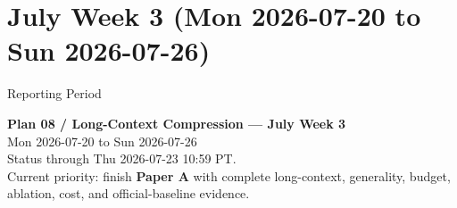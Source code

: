 
\providecommand{\paref}[2]{\href{../../papers/paper-a-latent-memory/#1}{\textcolor{blue}{#2}}}

\section{July Week 3 (Mon 2026-07-20 to Sun 2026-07-26)}

\begin{frame}{Reporting Period}
  \begin{center}
    \textbf{Plan 08 / Long-Context Compression --- July Week 3} \\[0.3em]
    \small Mon 2026-07-20 to Sun 2026-07-26 \\
    \scriptsize Status through Thu 2026-07-23 10:59 PT. \\
    \scriptsize Current priority: finish \textbf{Paper A} with complete long-context, generality,
    budget, ablation, cost, and official-baseline evidence.
  \end{center}
\end{frame}

